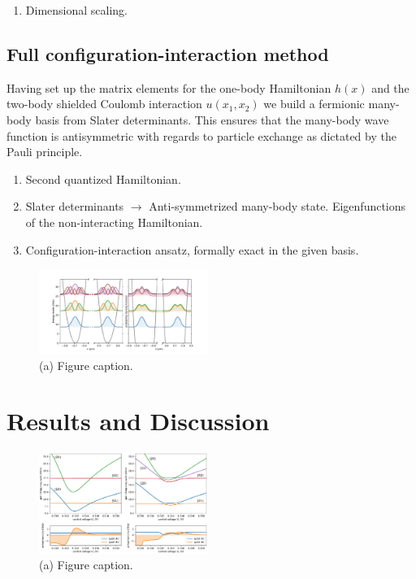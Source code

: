 \documentclass[twocolumn,superscriptaddress,unsortedaddress,
 amsmath,amssymb,
 aps,
]{revtex4-2}
\begin{document}
        \begin{enumerate}
            \item Dimensional scaling.
        \end{enumerate}

    \subsection{Full configuration-interaction method}
        Having set up the matrix elements for the one-body Hamiltonian $h(x)$ and the
        two-body shielded Coulomb interaction $u(x_1, x_2)$ we build a fermionic
        many-body basis from Slater determinants.
        This ensures that the many-body wave function is antisymmetric with regards to
        particle exchange as dictated by the Pauli principle.

        \begin{enumerate}
            \item Second quantized Hamiltonian.
            \item Slater determinants $\to$ Anti-symmetrized many-body state.
                Eigenfunctions of the non-interacting Hamiltonian.
            \item Configuration-interaction ansatz, formally exact in the given basis.
        \end{enumerate}
        
\begin{figure}
\includegraphics[width=0.49\textwidth]{figure2.pdf}
\caption{\label{fig3} (a) Figure caption.}
\end{figure}

\section{Results and Discussion} %

\begin{figure}
\includegraphics[width=0.49\textwidth]{figure3.pdf}
\caption{\label{fig3} (a) Figure caption.}
\end{figure}
\end{document}
